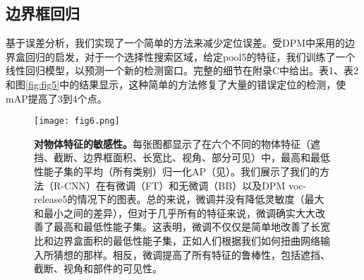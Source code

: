 \documentclass[../main.tex]{subfile}
\begin{document}
\subsection{边界框回归}

基于误差分析，我们实现了一个简单的方法来减少定位误差。受DPM\cite{dpm}中采用的边界盒回归的启发，对于一个选择性搜索区域，给定pool5的特征，我们训练了一个线性回归模型，以预测一个新的检测窗口。完整的细节在附录C中给出。表1、表2和图\ref{fig:fig5}中的结果显示，这种简单的方法修复了大量的错误定位的检测，使mAP提高了3到4个点。

\begin{figure}[H]
    \centering
    \texttt{[image: fig6.png]}
    \caption{\textbf{对物体特征的敏感性。}每张图都显示了在六个不同的物体特征（遮挡、截断、边界框面积、长宽比、视角、部分可见）中，最高和最低性能子集的平均（所有类别）归一化AP（见\cite{dpm}）。我们展示了我们的方法（R-CNN）在有微调（FT）和无微调（BB）以及DPM voc-release5的情况下的图表。总的来说，微调并没有降低灵敏度（最大和最小之间的差异），但对于几乎所有的特征来说，微调确实大大改善了最高和最低性能子集。这表明，微调不仅仅是简单地改善了长宽比和边界盒面积的最低性能子集，正如人们根据我们如何扭曲网络输入所猜想的那样。相反，微调提高了所有特征的鲁棒性，包括遮挡、截断、视角和部件的可见性。}
    \label{fig:fig6}
\end{figure}
\end{document}
